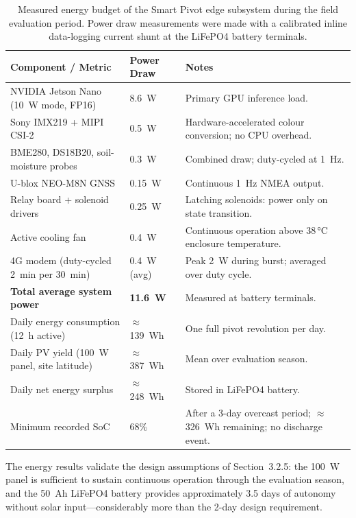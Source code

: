 \documentclass[12pt,a4paper]{report}
\renewcommand{\arraystretch}{1.3}
\begin{document}
\begin{table}[H]
\centering
\small
\caption{Measured energy budget of the Smart Pivot edge subsystem during the field evaluation period. Power draw measurements were made with a calibrated inline data-logging current shunt at the LiFePO4 battery terminals.}
\label{tab:energy}
\setlength{\tabcolsep}{4pt}
\renewcommand{\arraystretch}{1.3}
\begin{tabular}{|P{0.32\textwidth}|C{0.16\textwidth}|P{0.42\textwidth}|}
\hline
{}
\textbf{Component / Metric} & \textbf{Power Draw} & \textbf{Notes} \\
\hline
NVIDIA Jetson Nano (10~W mode, FP16) & 8.6~W & Primary GPU inference load. \\
\hline
{}
Sony IMX219 + MIPI CSI-2 & 0.5~W & Hardware-accelerated colour conversion; no CPU overhead. \\
\hline
BME280, DS18B20, soil-moisture probes & 0.3~W & Combined draw; duty-cycled at 1~Hz. \\
\hline
{}
U-blox NEO-M8N GNSS & 0.15~W & Continuous 1~Hz NMEA output. \\
\hline
Relay board + solenoid drivers & 0.25~W & Latching solenoids: power only on state transition. \\
\hline
{}
Active cooling fan & 0.4~W & Continuous operation above 38\,°C enclosure temperature. \\
\hline
4G modem (duty-cycled 2~min per 30~min) & 0.4~W (avg) & Peak 2~W during burst; averaged over duty cycle. \\
\hline
{}
\textbf{Total average system power} & \textbf{11.6~W} & Measured at battery terminals. \\
\hline
Daily energy consumption (12~h active) & $\approx$139~Wh & One full pivot revolution per day. \\
\hline
{}
Daily PV yield (100~W panel, site latitude) & $\approx$387~Wh & Mean over evaluation season. \\
\hline
Daily net energy surplus & $\approx$248~Wh & Stored in LiFePO4 battery. \\
\hline
{}
Minimum recorded SoC & 68\% & After a 3-day overcast period; $\approx$326~Wh remaining; no discharge event. \\
\hline
\end{tabular}
\end{table}

The energy results validate the design assumptions of Section~3.2.5: the 100~W panel is sufficient to sustain continuous operation through the evaluation season, and the 50~Ah LiFePO4 battery provides approximately 3.5 days of autonomy without solar input---considerably more than the 2-day design requirement.
\end{document}
